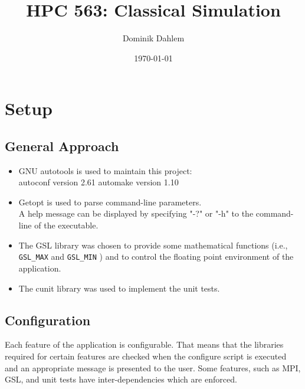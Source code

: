 \documentclass[12pt,a4paper]{report}
\author{Dominik Dahlem}
\title{HPC 563: Classical Simulation}
\date{\today}
\def\ccode#1{
  \lstinline[basicstyle=\ttfamily,language=C]{#1} }
\begin{document}
\maketitle

\chapter{Setup}
\label{cha:setup}

\section{General Approach}
\label{sec:general-approach}
\begin{itemize}
\item GNU autotools is used to maintain this project:\\
  autoconf version 2.61 automake version 1.10
\item Getopt is used to parse command-line parameters.\\
  A help message can be displayed by specifying "-?" or "-h" to the
  command-line of the executable.
\item The GSL library was chosen to provide some mathematical
  functions (i.e., \ccode{GSL_MAX} and \ccode{GSL_MIN}) and to control
  the floating point environment of the application.
\item The cunit library was used to implement the unit tests.
\end{itemize}

\section{Configuration}
\label{sec:configuration}
Each feature of the application is configurable. That means that the
libraries required for certain features are checked when the configure
script is executed and an appropriate message is presented to the
user. Some features, such as MPI, GSL, and unit tests have
inter-dependencies which are enforced.
\end{document}
